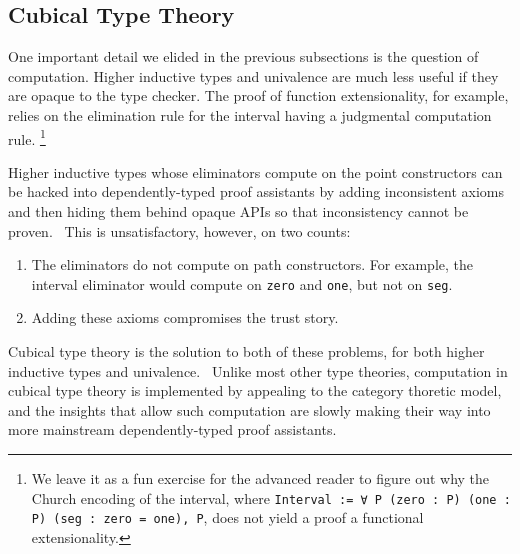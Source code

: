 
\subsection{Cubical Type Theory}\label{sec:fixes:theory:cubical}\label{sec:cubical}
One important detail we elided in the previous subsections is the question of computation.
Higher inductive types and univalence are much less useful if they are opaque to the type checker.
The proof of function extensionality, for example, relies on the elimination rule for the interval having a judgmental computation rule.%
\footnote{%
  We leave it as a fun exercise for the advanced reader to figure out why the Church encoding of the interval, where \texttt{Interval := ∀ P (zero : P) (one : P) (seg : zero = one), P}, does not yield a proof a functional extensionality.%
}

Higher inductive types whose eliminators compute on the point constructors can be hacked into dependently-typed proof assistants by adding inconsistent axioms and then hiding them behind opaque APIs so that inconsistency cannot be proven.~\cite{Running2011Licata,Bertot2013}
This is unsatisfactory, however, on two counts:
\begin{enumerate}
\item
  The eliminators do not compute on path constructors.
  For example, the interval eliminator would compute on \texttt{zero} and \texttt{one}, but not on \texttt{seg}.
\item
  Adding these axioms compromises the trust story.
\end{enumerate}

Cubical type theory is the solution to both of these problems, for both higher inductive types and univalence.~\cite{Cubical2016Cohen}
Unlike most other type theories, computation in cubical type theory is implemented by appealing to the category thoretic model, and the insights that allow such computation are slowly making their way into more mainstream dependently-typed proof assistants.~\cite{Cubical2019Vezzosi}

